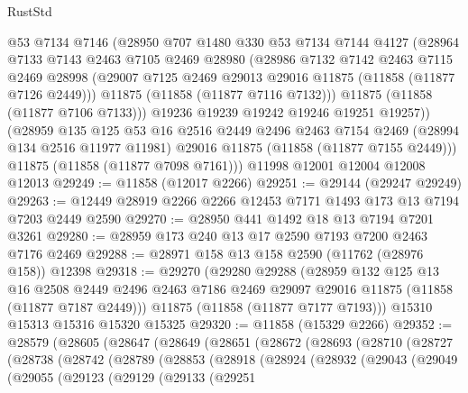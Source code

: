 \begin{lexlean}{RustStd}
\begin{coremodule}
        @53
        @7134
        @7146
        (@28950
          @707
          @1480
          @330
          @53
          @7134
          @7144
          @4127
          (@28964
            @7133
            @7143
            @2463
            @7105
            @2469
            @28980
            (@28986
              @7132
              @7142
              @2463
              @7115
              @2469
              @28998
              (@29007 @7125 @2469 @29013 @29016 @11875 (@11858 (@11877 @7126 @2449)))
              @11875
              (@11858 (@11877 @7116 @7132)))
            @11875
            (@11858 (@11877 @7106 @7133)))
          @19236
          @19239
          @19242
          @19246
          @19251
          @19257))
      (@28959
        @135
        @125
        @53
        @16
        @2516
        @2449
        @2496
        @2463
        @7154
        @2469
        (@28994 @134 @2516 @11977 @11981)
        @29016
        @11875
        (@11858 (@11877 @7155 @2449)))
      @11875
      (@11858 (@11877 @7098 @7161)))
    @11998
    @12001
    @12004
    @12008
    @12013
@29249 := @11858 (@12017 @2266)
@29251 := @29144 (@29247 @29249)
@29263 := @12449 @28919 @2266 @2266 @12453 @7171 @1493 @173 @13 @7194 @7203 @2449 @2590
@29270 := @28950 @441 @1492 @18 @13 @7194 @7201 @3261
@29280 := @28959 @173 @240 @13 @17 @2590 @7193 @7200 @2463 @7176 @2469
@29288 := @28971 @158 @13 @158 @2590 (@11762 (@28976 @158)) @12398
@29318 := @29270
    (@29280
      @29288
      (@28959
        @132
        @125
        @13
        @16
        @2508
        @2449
        @2496
        @2463
        @7186
        @2469
        @29097
        @29016
        @11875
        (@11858 (@11877 @7187 @2449)))
      @11875
      (@11858 (@11877 @7177 @7193)))
    @15310
    @15313
    @15316
    @15320
    @15325
@29320 := @11858 (@15329 @2266)
@29352 := @28579
    (@28605
      (@28647
        (@28649
          (@28651
            (@28672
              (@28693
                (@28710
                  (@28727
                    (@28738
                      (@28742
                        (@28789
                          (@28853
                            (@28918
                              (@28924
                                (@28932
                                  (@29043
                                    (@29049
                                      (@29055
                                        (@29123
                                          (@29129
                                            (@29133
                                              (@29251

\end{coremodule}
\end{lexlean}
